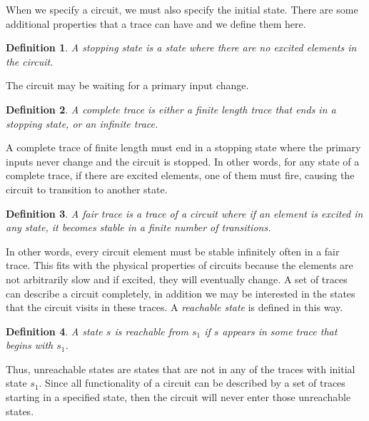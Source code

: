 \documentclass[12pt]{report}
\newtheorem*{definition}{Definition}
\begin{document}
When we specify a circuit, we must also specify the initial state.  
There are some additional properties that a trace can have and we define them here.
\begin{definition}
A {\em stopping state} is a state where there are no excited elements in the circuit. 
\end{definition} 
 The circuit may be waiting for a primary input change.
\begin{definition}
A {\em complete trace} is either a finite length trace that ends in a stopping state, or an infinite trace.
\end{definition}
A complete trace of finite length must end in a stopping state where the primary inputs never change and the circuit is stopped.  In other words, for any state of a complete trace, if there are excited elements, one of them must fire, causing the circuit to transition to another state.
\begin{definition}
A {\em fair trace} is a trace of a circuit where if an element is excited in any state, it becomes stable in a finite number of transitions.
\end{definition}
In other words, every circuit element must be stable infinitely often in a fair trace.  This fits with the physical properties of circuits because the elements are not arbitrarily slow and if excited, they will eventually change. 
A set of traces can describe a circuit completely, in addition we may be interested in the states that the circuit visits in these traces. 
A {\em reachable state} is defined in this way.
\begin{definition}
A state $s$ is {\em reachable} from $s_1$ if $s$ appears in some trace that begins with $s_1$.
\end{definition}
Thus, unreachable states are states that are not in any of the traces with initial state $s_1$.  Since all functionality of a circuit can be described by a set of traces starting in a specified state, then the circuit will never enter those unreachable states. 
\end{document}
